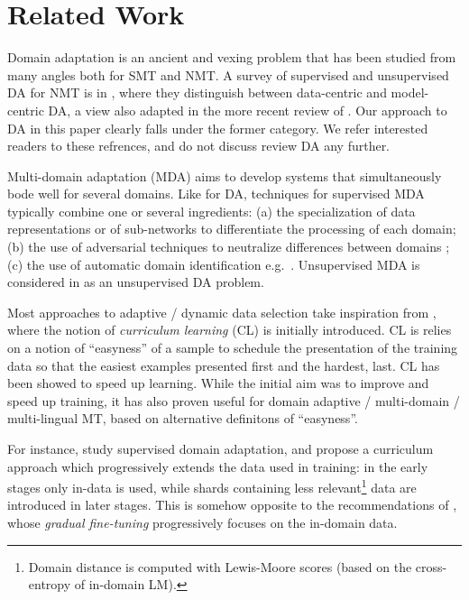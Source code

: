 \documentclass[11pt,a4paper]{article}
\newcommand{\fyTodo}[1]{\Todo[FY:]{\textcolor{orange}{#1}}}
\begin{document}
\section{Related Work \label{sec:related}}

Domain adaptation is an ancient and vexing problem that has been studied from many angles both for SMT and NMT. A survey of supervised and unsupervised DA for NMT is in \cite{Chu18asurvey}, where they distinguish between data-centric and model-centric DA, a view also adapted in the more recent review of \cite{Saunders21domain}. Our approach to DA in this paper clearly falls under the former category. We refer interested readers to these refrences, and do not discuss review DA any further.

Multi-domain adaptation (MDA) aims to develop systems that simultaneously bode well for several domains. Like for DA, techniques for supervised MDA typically combine one or several ingredients: (a) the specialization of data representations \citep{Kobus17domaincontrol} or of sub-networks \citep{Pham19generic} to differentiate the processing of each domain; (b) the use of adversarial techniques to neutralize differences between domains \cite{Britz17mixing,Zeng18multidomain}; (c) the use of automatic domain identification e.g.\ \citep{Jiang19multidomain}. Unsupervised MDA is considered in \citep{Farajian17multidomain} as an unsupervised DA problem.

Most approaches to adaptive / dynamic data selection take inspiration from \citep{Bengio09curriculum}, where the notion of \emph{curriculum learning} (CL) is initially introduced. CL is relies on a notion of ``easyness'' of a sample to schedule the presentation of the training data so that the easiest examples  presented first and the hardest, last. CL has been showed to speed up learning. While the initial aim was to improve and speed up training, it has also proven useful for domain adaptive / multi-domain / multi-lingual MT, based on alternative definitons of ``easyness''.

For instance, \citet{Zhang19curriculum} study supervised domain adaptation, and propose a curriculum approach which progressively extends the data used in training: in the early stages only in-data is used, while shards containing less relevant\footnote{Domain distance is computed with Lewis-Moore scores (based on the cross-entropy of in-domain LM).} data are introduced in later stages. This is somehow opposite to the recommendations of \cite{Vanderwees17dynamic}, whose \emph{gradual fine-tuning} progressively focuses on the in-domain data.\fyTodo{These have not been compared ? and also to what we do ?} 
\end{document}
